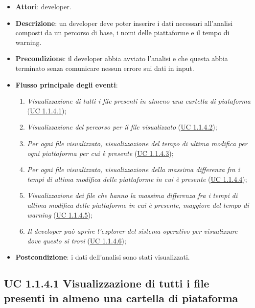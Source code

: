 		\begin{itemize}
			\item\textbf{Attori}: developer.
			\item\textbf{Descrizione}: un developer deve poter inserire i dati necessari all'analisi composti da un percorso di base, i nomi delle piattaforme e il tempo di warning.
			\item\textbf{Precondizione}: il developer abbia avviato l'analisi e che questa abbia terminato senza comunicare nessun errore sui dati in input.
			\item\textbf{Flusso principale degli eventi}: 
			\begin{enumerate}
				\item\textit{Visualizzazione di tutti i file presenti in almeno una cartella di piataforma} (\hyperref[subsec:UC1.1.4.1]{UC 1.1.4.1});
				
				\item\textit{Visualizzazione del percorso per il file visualizzato} (\hyperref[subsec:UC1.1.4.2]{UC 1.1.4.2});
				
				\item\textit{Per ogni file visualizzato, visualizzazione del tempo di ultima modifica per ogni piattaforma per cui è presente} (\hyperref[subsec:UC1.1.4.3]{UC 1.1.4.3});
				
				\item\textit{Per ogni file visualizzato, visualizzazione della massima differenza fra i tempi di ultima modifica delle piattaforme in cui è presente} (\hyperref[subsec:UC1.1.4.4]{UC 1.1.4.4});
				
				\item\textit{Visualizzazione dei file che hanno la massima differenza fra i tempi di ultima modifica delle piattaforme in cui è presente, maggiore del tempo di warning} (\hyperref[subsec:UC1.1.4.5]{UC 1.1.4.5});
				
				\item\textit{Il developer può aprire l'explorer del sistema operativo per visualizzare dove questo si trovi} (\hyperref[subsec:UC1.1.4.6]{UC 1.1.4.6});
				
			\end{enumerate}
			\item\textbf{Postcondizione}: i dati dell'analisi sono stati visualizzati.
		\end{itemize}

	\subsection{UC 1.1.4.1 Visualizzazione di tutti i file presenti in almeno una cartella di piataforma}
		\label{subsec:UC1.1.4.1}
		
